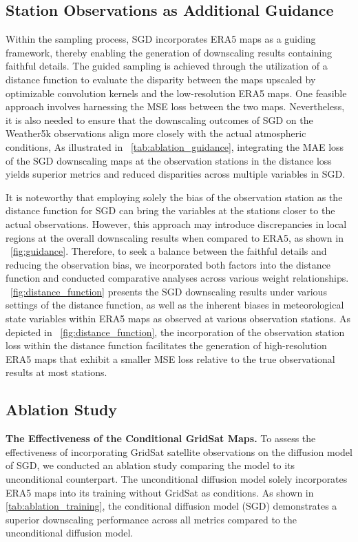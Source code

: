 \subsection{Station Observations as Additional Guidance}
\label{distance_function}
Within the sampling process, SGD incorporates ERA5 maps as a guiding framework, thereby enabling the generation of downscaling results containing faithful details. 
The guided sampling is achieved through the utilization of a distance function to evaluate the disparity between the maps upscaled by optimizable convolution kernels and the low-resolution ERA5 maps. 
One feasible approach involves harnessing the MSE loss between the two maps. 
Nevertheless, it is also needed to ensure that the downscaling outcomes of SGD on the Weather5k observations align more closely with the actual atmospheric conditions, 
As illustrated in ~\cref{tab:ablation_guidance}, integrating the MAE loss of the SGD downscaling maps at the observation stations in the distance loss yields superior metrics and reduced disparities across multiple variables in SGD. 

It is noteworthy that employing solely the bias of the observation station as the distance function for SGD can bring the variables at the stations closer to the actual observations. 
However, this approach may introduce discrepancies in local regions at the overall downscaling results when compared to ERA5, as shown in ~\cref{fig:guidance}. 
Therefore, to seek a balance between the faithful details and reducing the observation bias, we incorporated both factors into the distance function and conducted comparative analyses across various weight relationships. 
~\cref{fig:distance_function} presents the SGD downscaling results under various settings of the distance function, as well as the inherent biases in meteorological state variables within ERA5 maps as observed at various observation stations. 
As depicted in ~\cref{fig:distance_function}, the incorporation of the observation station loss within the distance function facilitates the generation of high-resolution ERA5 maps that exhibit a smaller MSE loss relative to the true observational results at most stations. 

\subsection{Ablation Study}
\label{ablation_study}
\textbf{The Effectiveness of the Conditional GridSat Maps.} 
To assess the effectiveness of incorporating GridSat satellite observations on the diffusion model of SGD, we conducted an ablation study comparing the model to its unconditional counterpart. 
The unconditional diffusion model solely incorporates ERA5 maps into its training without GridSat as conditions.
As shown in \cref{tab:ablation_training}, the conditional diffusion model (SGD) demonstrates a superior downscaling performance across all metrics compared to the unconditional diffusion model. 

